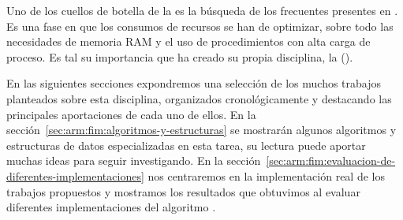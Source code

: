Uno de los cuellos de botella de la \arm es la búsqueda de los \itemsets frecuentes presentes en \D. Es una fase en que los consumos de recursos se han de optimizar, sobre todo las necesidades de memoria RAM y el uso de procedimientos con alta carga de proceso. Es tal su importancia que ha creado su propia disciplina, la \fim (\FIM). 

En las siguientes secciones expondremos una selección de los muchos trabajos planteados sobre esta disciplina, organizados cronológicamente y destacando las principales aportaciones de cada uno de ellos. En la sección~\ref{sec:arm:fim:algoritmos-y-estructuras} se mostrarán algunos algoritmos y estructuras de datos especializadas en esta tarea, su lectura puede aportar muchas ideas para seguir investigando. En la sección~\ref{sec:arm:fim:evaluacion-de-diferentes-implementaciones} nos centraremos en la implementación real de los trabajos propuestos y mostramos los resultados que obtuvimos al evaluar diferentes implementaciones del algoritmo \apriori.
